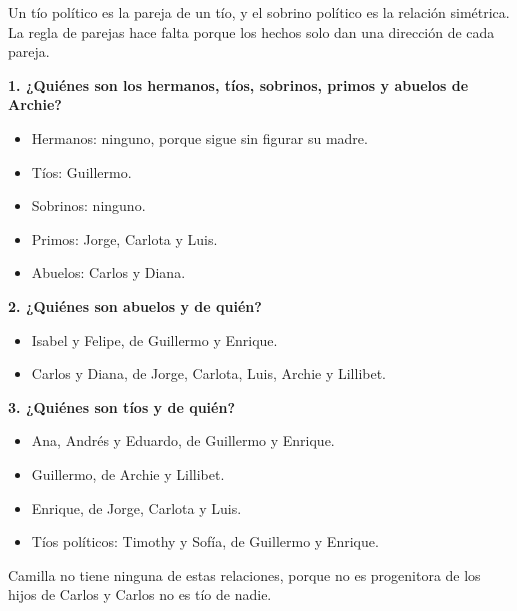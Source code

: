 Un tío político es la pareja de un tío, y el sobrino político es la relación simétrica. La regla de parejas hace falta porque los hechos solo dan una dirección de cada pareja.

\textbf{1. ¿Quiénes son los hermanos, tíos, sobrinos, primos y abuelos de Archie?}

\begin{itemize}
\item Hermanos: ninguno, porque sigue sin figurar su madre.
\item Tíos: Guillermo.
\item Sobrinos: ninguno.
\item Primos: Jorge, Carlota y Luis.
\item Abuelos: Carlos y Diana.
\end{itemize}

\textbf{2. ¿Quiénes son abuelos y de quién?}

\begin{itemize}
\item Isabel y Felipe, de Guillermo y Enrique.
\item Carlos y Diana, de Jorge, Carlota, Luis, Archie y Lillibet.
\end{itemize}

\textbf{3. ¿Quiénes son tíos y de quién?}

\begin{itemize}
\item Ana, Andrés y Eduardo, de Guillermo y Enrique.
\item Guillermo, de Archie y Lillibet.
\item Enrique, de Jorge, Carlota y Luis.
\item Tíos políticos: Timothy y Sofía, de Guillermo y Enrique.
\end{itemize}

Camilla no tiene ninguna de estas relaciones, porque no es progenitora de los hijos de Carlos y Carlos no es tío de nadie.

